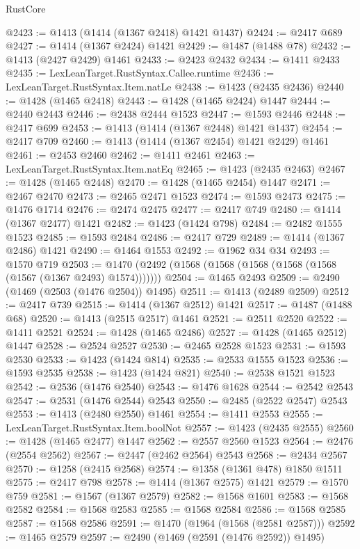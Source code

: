 \begin{lexlean}{RustCore}
\begin{coremodule}
@2423 := @1413 (@1414 (@1367 @2418) @1421 @1437)
@2424 := @2417 @689
@2427 := @1414 (@1367 @2424) @1421
@2429 := @1487 (@1488 @78)
@2432 := @1413 (@2427 @2429) @1461
@2433 := @2423 @2432
@2434 := @1411 @2433
@2435 := LexLeanTarget.RustSyntax.Callee.runtime
@2436 := LexLeanTarget.RustSyntax.Item.natLe
@2438 := @1423 (@2435 @2436)
@2440 := @1428 (@1465 @2418)
@2443 := @1428 (@1465 @2424) @1447
@2444 := @2440 @2443
@2446 := @2438 @2444 @1523
@2447 := @1593 @2446
@2448 := @2417 @699
@2453 := @1413 (@1414 (@1367 @2448) @1421 @1437)
@2454 := @2417 @709
@2460 := @1413 (@1414 (@1367 @2454) @1421 @2429) @1461
@2461 := @2453 @2460
@2462 := @1411 @2461
@2463 := LexLeanTarget.RustSyntax.Item.natEq
@2465 := @1423 (@2435 @2463)
@2467 := @1428 (@1465 @2448)
@2470 := @1428 (@1465 @2454) @1447
@2471 := @2467 @2470
@2473 := @2465 @2471 @1523
@2474 := @1593 @2473
@2475 := @1476 @1714
@2476 := @2474 @2475
@2477 := @2417 @749
@2480 := @1414 (@1367 @2477) @1421
@2482 := @1423 (@1424 @798)
@2484 := @2482 @1555 @1523
@2485 := @1593 @2484
@2486 := @2417 @729
@2489 := @1414 (@1367 @2486) @1421
@2490 := @1464 @1553
@2492 := @1962 @34 @34
@2493 := @1570 @719
@2503 := @1470 (@2492 (@1568 (@1568 (@1568 (@1568 (@1568 (@1567 (@1367 @2493) @1574)))))))
@2504 := @1465 @2493
@2509 := @2490 (@1469 (@2503 (@1476 @2504)) @1495)
@2511 := @1413 (@2489 @2509)
@2512 := @2417 @739
@2515 := @1414 (@1367 @2512) @1421
@2517 := @1487 (@1488 @68)
@2520 := @1413 (@2515 @2517) @1461
@2521 := @2511 @2520
@2522 := @1411 @2521
@2524 := @1428 (@1465 @2486)
@2527 := @1428 (@1465 @2512) @1447
@2528 := @2524 @2527
@2530 := @2465 @2528 @1523
@2531 := @1593 @2530
@2533 := @1423 (@1424 @814)
@2535 := @2533 @1555 @1523
@2536 := @1593 @2535
@2538 := @1423 (@1424 @821)
@2540 := @2538 @1521 @1523
@2542 := @2536 (@1476 @2540)
@2543 := @1476 @1628
@2544 := @2542 @2543
@2547 := @2531 (@1476 @2544) @2543
@2550 := @2485 (@2522 @2547) @2543
@2553 := @1413 (@2480 @2550) @1461
@2554 := @1411 @2553
@2555 := LexLeanTarget.RustSyntax.Item.boolNot
@2557 := @1423 (@2435 @2555)
@2560 := @1428 (@1465 @2477) @1447
@2562 := @2557 @2560 @1523
@2564 := @2476 (@2554 @2562)
@2567 := @2447 (@2462 @2564) @2543
@2568 := @2434 @2567
@2570 := @1258 (@2415 @2568)
@2574 := @1358 (@1361 @478) @1850 @1511
@2575 := @2417 @798
@2578 := @1414 (@1367 @2575) @1421
@2579 := @1570 @759
@2581 := @1567 (@1367 @2579)
@2582 := @1568 @1601
@2583 := @1568 @2582
@2584 := @1568 @2583
@2585 := @1568 @2584
@2586 := @1568 @2585
@2587 := @1568 @2586
@2591 := @1470 (@1964 (@1568 (@2581 @2587)))
@2592 := @1465 @2579
@2597 := @2490 (@1469 (@2591 (@1476 @2592)) @1495)

\end{coremodule}
\end{lexlean}
